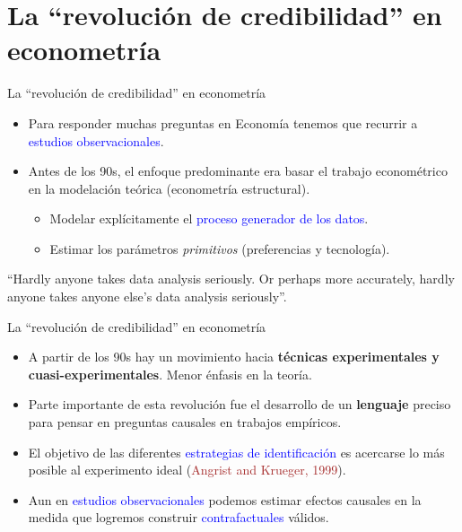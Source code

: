 \documentclass[10pt, xcolor=dvipsnames]{beamer}
\begin{document}
\section{La ``revolución de credibilidad'' en econometría}

\begin{frame}{La ``revolución de credibilidad'' en econometría}
\begin{itemize}\setlength{\itemsep}{1.5em}
    \item Para responder muchas preguntas en Economía tenemos que recurrir a \textcolor{blue}{estudios observacionales}.%
    \item Antes de los 90s, el enfoque predominante era basar el trabajo econométrico en la modelación teórica (econometría estructural). \vspace{0.2cm}
    \begin{itemize}	
    \item Modelar explícitamente el \textcolor{blue}{proceso generador de los datos}.
    \item Estimar los parámetros \textit{primitivos} (preferencias y tecnología). \vspace{0.3cm}
    \end{itemize}
\end{itemize}
    \begin{tcolorbox}[colback=gray!10, title=\citet{leamer1983let}, breakable]
    ``Hardly anyone takes data analysis seriously. Or perhaps more accurately, hardly anyone takes anyone else’s data analysis seriously''.
    \end{tcolorbox}
\end{frame}


\begin{frame}{La ``revolución de credibilidad'' en econometría}
\begin{itemize}
    \item A partir de los 90s hay un movimiento hacia \textbf{técnicas experimentales y cuasi-experimentales}. Menor énfasis en la teoría.  
    \vspace{0.3cm}
    \item Parte importante de esta revolución fue el desarrollo de un \textbf{lenguaje} preciso para pensar en preguntas causales en trabajos empíricos.
    \vspace{0.3cm}
    \item El objetivo de las diferentes \textcolor{blue}{estrategias de identificación} es acercarse lo más posible al experimento ideal (\textcolor{brown}{Angrist and Krueger, 1999}).
    \vspace{0.3cm}
    \item Aun en \textcolor{blue}{estudios observacionales} podemos estimar efectos causales en la medida que logremos construir \textcolor{blue}{contrafactuales} válidos.	
\end{itemize}
\end{frame}
\end{document}
